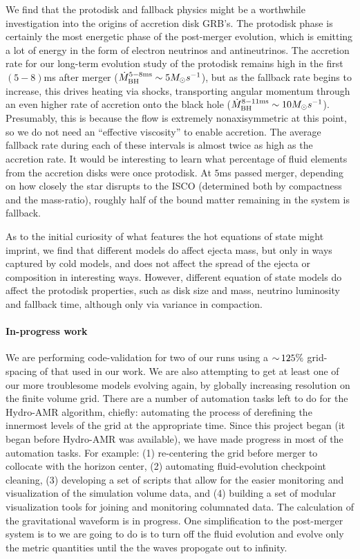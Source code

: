 We find that the protodisk and fallback physics might be a worthwhile investigation into the origins of accretion disk GRB's.
The protodisk phase is certainly the most energetic phase of the post-merger evolution, which is emitting a lot of energy in the form of electron neutrinos and antineutrinos. 
The accretion rate for our long-term evolution study of the protodisk remains high in the first $(5-8)$ms after merger ($\dot{M}^{5-8 {\rm ms}}_{\rm BH} \sim 5 M_\odot s^{-1}$), but as the fallback rate begins to increase, this drives heating via shocks, transporting angular momentum through an even higher rate of accretion onto the black hole ($\dot{M}^{8-11 {\rm ms}}_{\rm BH} \sim 10 M_\odot s^{-1}$).
Presumably, this is because the flow is extremely nonaxisymmetric at this point, so we do not need an ``effective viscosity'' to enable accretion.
The average fallback rate during each of these intervals is almost twice as high as the accretion rate.
It would be interesting to learn what percentage of fluid elements from the accretion disks were once protodisk.
At $5$ms passed merger, depending on how closely the star disrupts to the ISCO (determined both by compactness and the mass-ratio), roughly half of the bound matter remaining in the system is fallback.

As to the initial curiosity of what features the hot equations of state might imprint, we find that different models do affect ejecta mass, but only in ways captured by cold models, and does not affect the spread of the ejecta or composition in interesting ways.
However, different equation of state models do affect the protodisk properties, such as disk size and mass, neutrino luminosity and fallback time, although only via variance in compaction.
 

\paragraph{In-progress work}

We are performing code-validation for two of our runs using a $\mathord{\sim}\,125\%$ grid-spacing of that used in our work.
We are also attempting to get at least one of our more troublesome models evolving again, by globally increasing resolution on the finite volume grid.
There are a number of automation tasks left to do for the Hydro-AMR algorithm, chiefly: automating the process of derefining the innermost levels of the grid at the appropriate time.
Since this project began (it began before Hydro-AMR was available), we have made progress in most of the automation tasks. For example:
(1) re-centering the grid before merger to collocate with the horizon center, 
(2) automating fluid-evolution checkpoint cleaning, 
(3) developing a set of scripts that allow for the easier monitoring and visualization of the simulation volume data, 
and (4) building a set of modular visualization tools for joining and monitoring columnated data.
The calculation of the gravitational waveform is in progress.
One simplification to the post-merger system is to  we are going to do is to turn off the fluid evolution and evolve only the metric quantities until the the waves propogate out to infinity.

